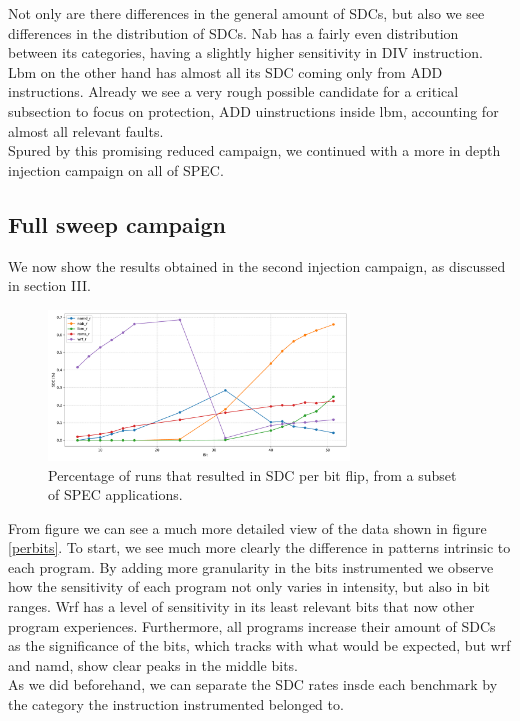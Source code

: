 \documentclass[lettersize,journal]{IEEEtran}
\begin{document}
Not only are there differences in the general amount of SDCs, but also we see differences in the distribution of SDCs. Nab has a fairly even distribution between its categories, having a slightly higher sensitivity in DIV instruction. Lbm on the other hand has almost all its SDC coming only from ADD instructions. Already we see a very rough possible candidate for a critical subsection to focus on protection, ADD uinstructions inside lbm, accounting for almost all relevant faults.\\
Spured by this promising reduced campaign, we continued with a more in depth injection campaign on all of SPEC.

\subsection{Full sweep campaign}
We now show the results obtained in the second injection campaign, as discussed in section III.
\begin{figure}[!t] 
    \centering
    \includegraphics[width=8cm]{plots/sdc_percentage_by_bit.pdf}
\caption{Percentage of runs that resulted in SDC per bit flip, from a subset of SPEC applications.}
\label{general}
\end{figure}
From figure \label{general} we can see a much more detailed view of the data shown in figure \ref{perbits}. To start, we see much more clearly the difference in patterns intrinsic to each program. By adding more granularity in the bits instrumented we observe how the sensitivity of each program not only varies in intensity, but also in bit ranges. Wrf has a level of sensitivity in its least relevant bits that now other program experiences. Furthermore, all programs increase their amount of SDCs as the significance of the bits, which tracks with what would be expected, but wrf and namd, show clear peaks in the middle bits. \\
As we did beforehand, we can separate the SDC rates insde each benchmark by the category the instruction instrumented belonged to.
\end{document}
